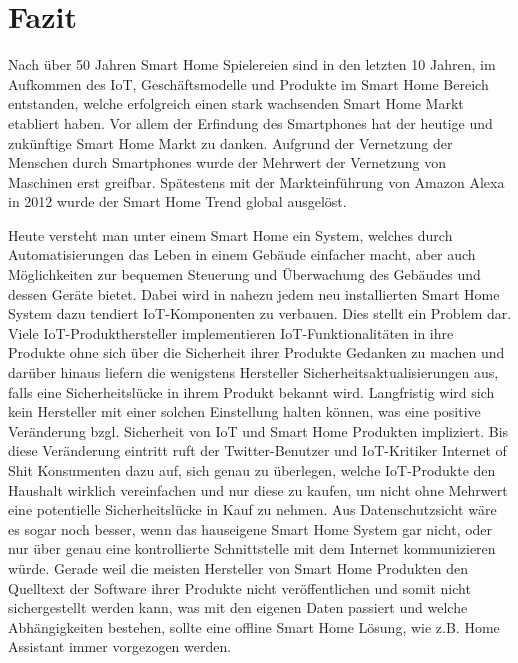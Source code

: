 \section{Fazit}

Nach über 50 Jahren Smart Home Spielereien sind in den letzten 10 Jahren, im Aufkommen des \ac{IoT}, Geschäftsmodelle und Produkte im Smart Home Bereich entstanden, welche erfolgreich einen stark wachsenden Smart Home Markt etabliert haben.
Vor allem der Erfindung des Smartphones hat der heutige und zukünftige Smart Home Markt zu danken.
Aufgrund der Vernetzung der Menschen durch Smartphones wurde der Mehrwert der Vernetzung von Maschinen erst greifbar.
Spätestens mit der Markteinführung von Amazon Alexa in 2012 wurde der Smart Home Trend global ausgelöst.

Heute versteht man unter einem Smart Home ein System, welches durch Automatisierungen das Leben in einem Gebäude einfacher macht, aber auch Möglichkeiten zur bequemen Steuerung und Überwachung des Gebäudes und dessen Geräte bietet.
Dabei wird in nahezu jedem neu installierten Smart Home System dazu tendiert \ac{IoT}-Komponenten zu verbauen.
Dies stellt ein Problem dar.
Viele \ac{IoT}-Produkthersteller implementieren \ac{IoT}-Funktionalitäten in ihre Produkte ohne sich über die Sicherheit ihrer Produkte Gedanken zu machen und darüber hinaus liefern die wenigstens Hersteller Sicherheitsaktualisierungen aus, falls eine Sicherheitslücke in ihrem Produkt bekannt wird.
Langfristig wird sich kein Hersteller mit einer solchen Einstellung halten können, was eine positive Veränderung bzgl. Sicherheit von \ac{IoT} und Smart Home Produkten impliziert.
Bis diese Veränderung eintritt ruft der Twitter-Benutzer und \ac{IoT}-Kritiker \glqq Internet of Shit\grqq{} Konsumenten dazu auf, sich genau zu überlegen, welche \ac{IoT}-Produkte den Haushalt wirklich vereinfachen und nur diese zu kaufen, um nicht ohne Mehrwert eine potentielle Sicherheitslücke in Kauf zu nehmen.
Aus Datenschutzsicht wäre es sogar noch besser, wenn das hauseigene Smart Home System gar nicht, oder nur über genau eine kontrollierte Schnittstelle mit dem Internet kommunizieren würde.
Gerade weil die meisten Hersteller von Smart Home Produkten den Quelltext der Software ihrer Produkte nicht veröffentlichen und somit nicht sichergestellt werden kann, was mit den eigenen Daten passiert und welche Abhängigkeiten bestehen, sollte eine offline Smart Home Lösung, wie z.B. Home Assistant immer vorgezogen werden.

